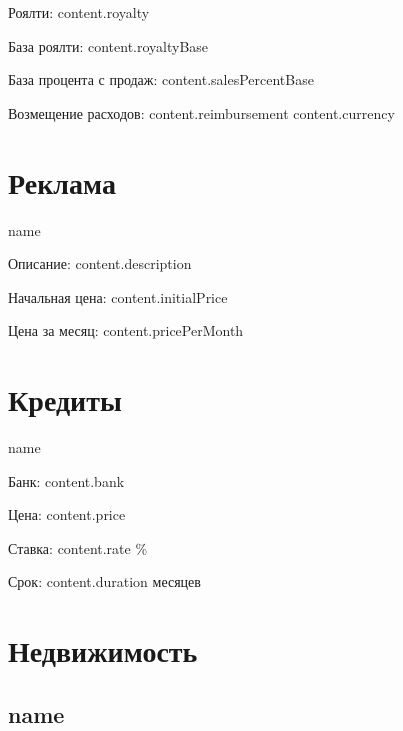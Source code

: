 \documentclass[a4paper,12pt]{article}
\begin{document}
{{{{{{{{      Роялти: {{ content.royalty }}
      
      База роялти: {{ content.royaltyBase }}
      
      База процента с продаж: {{ content.salesPercentBase }}

      Возмещение расходов: {{ content.reimbursement }} {{ content.currency }}
  {%
{%

{%
  \section{Реклама}
  {%
    {%
      {{ name }}

      Описание: {{ content.description }}
      
      Начальная цена: {{ content.initialPrice }}
      
      Цена за месяц: {{ content.pricePerMonth }}
    {%
  {%
{%

{%
  \section{Кредиты}
  {%
      {{ name }}

      Банк: {{ content.bank }}
      
      Цена: {{ content.price }}
      
      Ставка: {{ content.rate }} \%

      Срок: {{ content.duration }} месяцев
  {%
{%

{%
  \section{Недвижимость}
  {%
    \subsection{ {{ name }} }

}}}}}}}}}}}}}}}}}}}}}}
\end{document}
